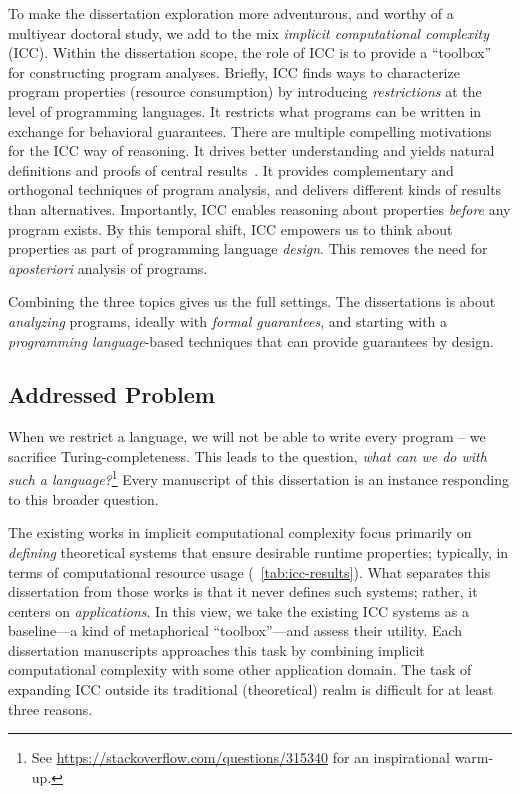 To make the dissertation exploration more adventurous, and worthy of a multiyear doctoral study, we add
to the mix \emph{implicit computational complexity} (ICC).
Within the dissertation scope, the role of ICC is to provide a \enquote{toolbox} for constructing program analyses.
Briefly, ICC finds ways to characterize program properties (resource consumption) by introducing \emph{restrictions} at the level of programming languages.
It restricts what programs can be written in exchange for behavioral guarantees.
There are multiple compelling motivations for the ICC way of reasoning.
It drives better understanding and yields natural definitions and proofs of central results~\cite{kristiansen2017}.
It provides complementary and orthogonal techniques of program analysis, and delivers different kinds of results than alternatives.
Importantly, ICC enables reasoning about properties \emph{before} any program exists.
By this temporal shift, ICC empowers us to think about properties as part of programming language \emph{design}.
This removes the need for \emph{aposteriori} analysis of programs.

Combining the three topics gives us the full settings.
The dissertations is about \emph{analyzing} programs, ideally with \emph{formal guarantees}, and starting with a \emph{programming language}-based techniques that can provide guarantees by design.

\subsection{Addressed Problem}
\label{subsec:problem}

When we restrict a language, we will not be able to write every program -- \ie we sacrifice Turing-completeness.
This leads to the question, \emph{what can we do with such a language?}\footnote{
See \url{https://stackoverflow.com/questions/315340} for an inspirational warm-up.}
Every manuscript of this dissertation is an instance responding to this broader question.

The existing works in implicit computational complexity focus primarily on \emph{defining} theoretical systems that ensure desirable runtime properties;
typically, in terms of computational resource usage (\cf~\autoref{tab:icc-results}).
What separates this dissertation from those works is that it never defines such systems;
rather, it centers on \emph{applications}.
In this view, we take the existing ICC systems as a baseline---a kind of metaphorical \enquote{toolbox}---and assess their utility.
Each dissertation manuscripts approaches this task by combining implicit computational complexity with some other application domain.
The task of expanding ICC outside its traditional (theoretical) realm is difficult for at least three reasons.

